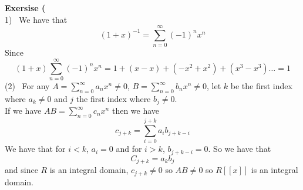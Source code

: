 \documentclass[12pt]{article}
\newenvironment{ques}[1]{\textbf{Exersise #1}\vspace{1 mm}\\ }{\bigskip}
\theoremstyle{definition}
\begin{document}
\begin{ques}{3.6}
	(1) \ We have that
	$$(1 + x)^{-1} = \sum^{\infty}_{n=0} (-1)^nx^n$$
	Since
	$$(1 + x)\sum^{\infty}_{n=0} (-1)^nx^n = 1 + (x - x) + (-x^2 + x^2) + (x^3
	- x^3) \dots = 1$$
	(2) \ For any $A = \sum_{n=0}^\infty a_nx^n \neq 0$, $B =
	\sum_{n=0}^\infty b_nx^n \neq 0$, let $k$ be the first
	index where $a_k \neq 0$ and $j$ the first index where $b_j \neq 0$.\\
	If we have $AB = \sum_{n=0}^\infty c_nx^n$ then we have 
	$$c_{j + k} = \sum_{i = 0}^{j + k} a_ib_{j+k - i}$$
	We have that for $i < k$, $a_i = 0$ and for $i > k$, $b_{j+k-i} = 0$. So we have that
	$$C_{j+k} = a_kb_j$$
	and since $R$ is an integral domain, $c_{j+k} \neq 0$ so $AB \neq 0$ so
	$R[[x]]$ is an integral domain.
\end{ques}
\end{document}
